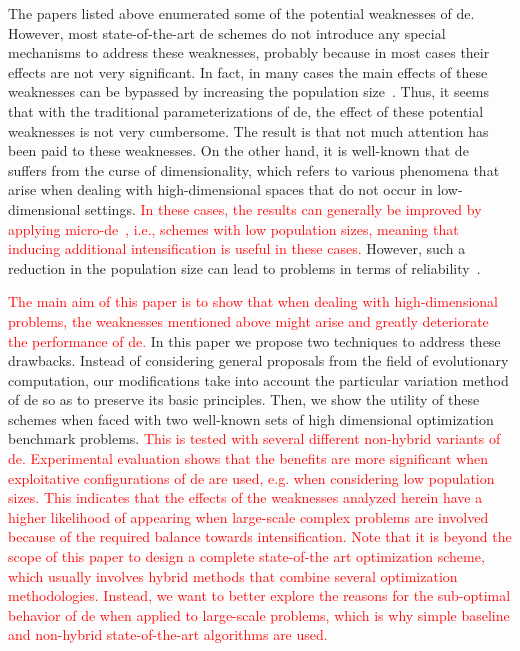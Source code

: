 \documentclass[preprint,3p]{elsarticle}
\newcommand{\DE}{{\sc de}}
\begin{document}
The papers listed above enumerated some of the potential weaknesses of \DE{}.
%
However, most state-of-the-art \DE{} schemes do not introduce any special mechanisms to address these weaknesses,
probably because in most cases their effects are not very significant.
%
In fact, in many cases the main effects of these weaknesses can be bypassed by increasing the population size~\cite{Lampinen:00}.
%
Thus, it seems that with the traditional parameterizations of \DE{},
the effect
of these potential weaknesses is not very cumbersome.
%
The result is that not much attention has been paid to these weaknesses.
%
On the other hand, it is well-known that \DE{} suffers from the curse of dimensionality, which refers
to various phenomena that arise when dealing with high-dimensional spaces that do not occur in low-dimensional settings.
%
%
\textcolor{red}{
In these cases, the results can generally be improved by applying micro-\DE{}~\cite{Olguin:13},
i.e., schemes with low population sizes, meaning that inducing additional intensification is useful
in these cases.
} 
%
However, such a reduction in the population size can lead to problems in terms of reliability~\cite{Zielinski:06}.

\textcolor{red}{
The main aim of this paper is to show that when dealing with high-dimensional problems, the weaknesses mentioned above might arise and greatly deteriorate
the performance of \DE{}.
}
%
In this paper we propose two techniques to address these drawbacks.
%
Instead of considering general proposals from the field of evolutionary computation, our modifications take into account
the particular variation method of \DE{} so as to preserve its basic principles.
%
Then, we show the utility of these schemes when faced with two well-known sets of high dimensional optimization benchmark problems.
%
\textcolor{red}{
This is tested with several different non-hybrid variants of \DE{}.
%
Experimental evaluation shows that the benefits are more significant when exploitative configurations
of \DE{} are used, e.g. when considering low population sizes.
}
%
%
%
%
\textcolor{red}{
This indicates that the effects of the weaknesses analyzed herein have a higher likelihood of appearing
when large-scale complex problems are involved because of the required balance towards intensification.
%
Note that it is beyond the scope of this paper to design a complete state-of-the art optimization scheme, 
which usually involves hybrid methods that combine several optimization methodologies.
%
Instead, we want to better explore the reasons for the sub-optimal behavior of \DE{}
when applied to large-scale problems,
which is why simple baseline and non-hybrid state-of-the-art algorithms are used.
}
%
\end{document}

